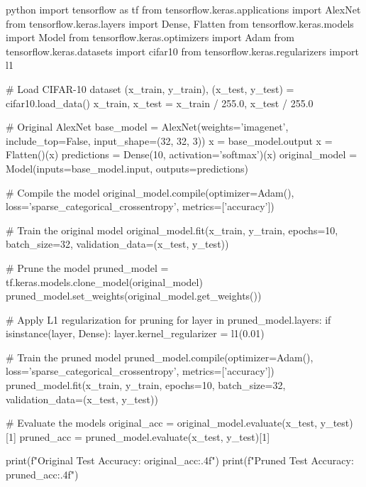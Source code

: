 python
import tensorflow as tf
from tensorflow.keras.applications import AlexNet
from tensorflow.keras.layers import Dense, Flatten
from tensorflow.keras.models import Model
from tensorflow.keras.optimizers import Adam
from tensorflow.keras.datasets import cifar10
from tensorflow.keras.regularizers import l1

# Load CIFAR-10 dataset
(x_train, y_train), (x_test, y_test) = cifar10.load_data()
x_train, x_test = x_train / 255.0, x_test / 255.0

# Original AlexNet
base_model = AlexNet(weights='imagenet', include_top=False, input_shape=(32, 32, 3))
x = base_model.output
x = Flatten()(x)
predictions = Dense(10, activation='softmax')(x)
original_model = Model(inputs=base_model.input, outputs=predictions)

# Compile the model
original_model.compile(optimizer=Adam(), loss='sparse_categorical_crossentropy', metrics=['accuracy'])

# Train the original model
original_model.fit(x_train, y_train, epochs=10, batch_size=32, validation_data=(x_test, y_test))

# Prune the model
pruned_model = tf.keras.models.clone_model(original_model)
pruned_model.set_weights(original_model.get_weights())

# Apply L1 regularization for pruning
for layer in pruned_model.layers:
    if isinstance(layer, Dense):
        layer.kernel_regularizer = l1(0.01)

# Train the pruned model
pruned_model.compile(optimizer=Adam(), loss='sparse_categorical_crossentropy', metrics=['accuracy'])
pruned_model.fit(x_train, y_train, epochs=10, batch_size=32, validation_data=(x_test, y_test))

# Evaluate the models
original_acc = original_model.evaluate(x_test, y_test)[1]
pruned_acc = pruned_model.evaluate(x_test, y_test)[1]

print(f"Original Test Accuracy: {original_acc:.4f}")
print(f"Pruned Test Accuracy: {pruned_acc:.4f}")
